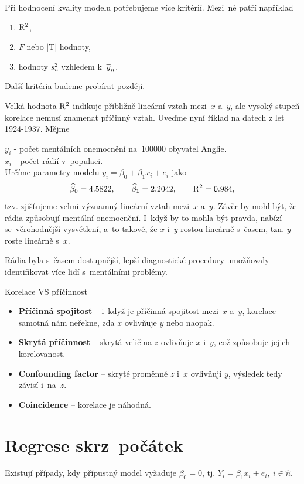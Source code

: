 Při hodnocení kvality modelu potřebujeme více kritérií. Mezi~ně patří například\begin{enumerate}
	\item {} $\mathrm{R}^2$,
	\item {} $F$ nebo $|\mathrm{T}|$ hodnoty,
	\item {} hodnoty $s_n^2$ vzhledem k~$\overline{y}_n$.
\end{enumerate}
Další kritéria budeme probírat později.
\begin{example}
	Velká hodnota $\mathrm{R}^2$ indikuje přibližně lineární vztah mezi~$x$ a~$y$, ale vysoký stupeň korelace nemusí znamenat příčinný vztah.
	Uveďme nyní říklad na datech z let 1924-1937. Mějme
	
	 $y_i$ - počet mentálních onemocnění na~$100000$ obyvatel Anglie.\\
	 $x_i$ - počet rádií v~populaci.\\
	Určíme parametry modelu $y_i = \beta_0+\beta_1 x_i+e_i$ jako
	 $$ \widehat{\beta}_0 = 4.5822,\qquad\widehat{\beta}_1 = 2.2042,\qquad\mathrm{R}^2 = 0.984, $$
	tzv. zjišťujeme velmi významný lineární vztah mezi~$x$ a~$y$. Závěr by mohl být, že rádia způsobují mentální onemocnění. I~když by to mohla být pravda, nabízí se~věrohodnější vysvětlení, a~to takové, že $x$ i~$y$ rostou lineárně s~časem, tzn. $y$ roste lineárně s~$x$.
	
	Rádia byla s~časem dostupnější, lepší diagnostické procedury umožňovaly identifikovat více lidí s~mentálními problémy.
\end{example}
\begin{remark}
Korelace VS příčinnost

 \begin{itemize}
  \item \textbf{Příčinná spojitost} -- i~když je příčinná spojitost mezi~$x$ a~$y$, korelace samotná nám neřekne, zda $x$ ovlivňuje $y$ nebo naopak.
  \item \textbf{Skrytá příčinnost} -- skrytá veličina $z$ ovlivňuje $x$ i~$y$, což způsobuje jejich korelovanost.
  \item \textbf{Confounding factor} -- skryté proměnné $z$ i~$x$ ovlivňují $y$, výsledek tedy závisí i~na~$z$.
  \item \textbf{Coincidence} -- korelace je náhodná.
\end{itemize}
\end{remark}

\section{Regrese skrz~počátek}
Existují případy, kdy přípustný model vyžaduje $\beta_0 = 0$, tj. $
 Y_i = \beta_1 x_i + e_i,~ i\in\widehat{n}$.


